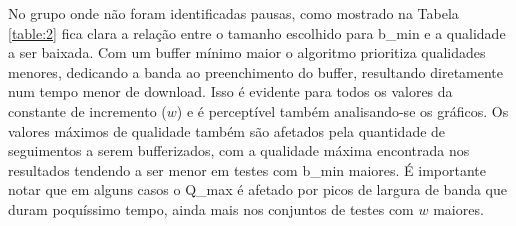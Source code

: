 \documentclass[10pt,twocolumn,letterpaper]{article}
\begin{document}
	No grupo onde não foram identificadas pausas, como mostrado na Tabela \ref{table:2} fica clara a relação entre o tamanho escolhido para b\_min e a qualidade a ser baixada. Com um buffer mínimo maior o algoritmo prioritiza qualidades menores, dedicando a banda ao preenchimento do buffer, resultando diretamente num tempo menor de download. Isso é evidente para todos os valores da constante de incremento ($w$) e é perceptível também analisando-se os gráficos. Os valores máximos de qualidade também são afetados pela quantidade de seguimentos a serem bufferizados, com a qualidade máxima encontrada nos resultados tendendo a ser menor em testes com b\_min maiores. É importante notar que em alguns casos o Q\_max é afetado por picos de largura de banda que duram poquíssimo tempo, ainda mais nos conjuntos de testes com $w$ maiores. 
	
\end{document}
